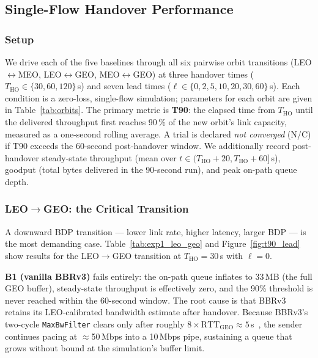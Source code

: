 \documentclass[conference]{IEEEtran}
\begin{document}
\subsection{Single-Flow Handover Performance}
\label{sec:exp1}

\subsubsection{Setup}

We drive each of the five baselines through all six pairwise orbit
transitions (LEO$\leftrightarrow$MEO, LEO$\leftrightarrow$GEO,
MEO$\leftrightarrow$GEO) at three handover times
($T_\mathrm{HO} \in \{30, 60, 120\}$\,s) and seven lead times
($\ell \in \{0, 2, 5, 10, 20, 30, 60\}$\,s).
Each condition is a zero-loss, single-flow simulation; parameters for each
orbit are given in Table~\ref{tab:orbits}.
The primary metric is \textbf{T90}: the elapsed time from
$T_\mathrm{HO}$ until the delivered throughput first reaches
90\,\% of the new orbit's link capacity, measured as a one-second rolling
average.
A trial is declared \emph{not converged} (N/C) if T90 exceeds the
60-second post-handover window.
We additionally record post-handover steady-state throughput
(mean over $t \in (T_\mathrm{HO}+20, T_\mathrm{HO}+60]$\,s),
goodput (total bytes delivered in the 90-second run),
and peak on-path queue depth.

\subsubsection{LEO$\to$GEO: the Critical Transition}

A downward BDP transition --- lower link rate, higher latency, larger BDP
--- is the most demanding case.
Table~\ref{tab:exp1_leo_geo} and Figure~\ref{fig:t90_lead} show results
for the LEO$\to$GEO transition at $T_\mathrm{HO} = 30$\,s with $\ell = 0$.

\textbf{B1 (vanilla BBRv3)} fails entirely: the on-path queue inflates to
33\,MB (the full GEO buffer), steady-state throughput is effectively zero,
and the 90\% threshold is never reached within the 60-second window.
The root cause is that BBRv3 retains its LEO-calibrated bandwidth estimate
after handover.
Because BBRv3's two-cycle \texttt{MaxBwFilter} clears only after roughly
$8 \times \mathrm{RTT}_\mathrm{GEO} \approx 5$\,s~\cite{cardwell2017},
the sender continues pacing at $\approx$50\,Mbps into a 10\,Mbps pipe,
sustaining a queue that grows without bound at the simulation's buffer limit.
\end{document}
